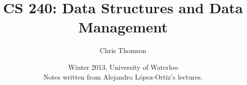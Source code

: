 \documentclass[]{article}
\begin{document}
\title{\bf{CS 240: Data Structures and Data Management}}
\date{Winter 2013, University of Waterloo \\ \center Notes written from Alejandro L\'opez-Ortiz's lectures.}
\author{Chris Thomson}
\maketitle
\newpage
\end{document}
